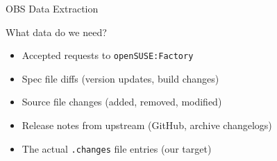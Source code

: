 \documentclass[aspectratio=169]{beamer}
\begin{document}
\begin{frame}[fragile]{OBS Data Extraction}
\begin{block}{What data do we need?}
\begin{itemize}
  \item Accepted requests to \texttt{openSUSE:Factory}
  \item Spec file diffs (version updates, build changes)
  \item Source file changes (added, removed, modified)
  \item Release notes from upstream (GitHub, archive changelogs)
  \item The actual \texttt{.changes} file entries (our target)
\end{itemize}
\end{block}
\end{frame}
\end{document}
